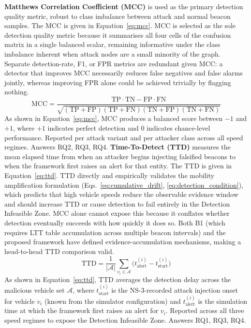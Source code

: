 \documentclass[12pt, a4paper]{report}
\begin{document}
\textbf{Matthews Correlation Coefficient (MCC)} is used as the
primary detection quality metric, robust to class imbalance between
attack and normal beacon samples. The MCC is given in
Equation~\ref{eq:mcc}.
\newline
\newline
MCC is selected as the sole detection quality metric because it
summarises all four cells of the confusion matrix in a single
balanced scalar, remaining informative under the class imbalance
inherent when attack nodes are a small minority of the graph.
Separate detection-rate, F1, or FPR metrics are redundant given
MCC: a detector that improves MCC necessarily reduces false
negatives and false alarms jointly, whereas improving FPR alone
could be achieved trivially by flagging nothing.
\begin{equation}
  \mathrm{MCC} = \frac{\mathrm{TP}\cdot\mathrm{TN}
                       - \mathrm{FP}\cdot\mathrm{FN}}
    {\sqrt{(\mathrm{TP}+\mathrm{FP})(\mathrm{TP}+\mathrm{FN})
           (\mathrm{TN}+\mathrm{FP})(\mathrm{TN}+\mathrm{FN})}}
  \label{eq:mcc}
\end{equation}
As shown in Equation~\ref{eq:mcc}, MCC produces a balanced score
between $-1$ and $+1$, where $+1$ indicates perfect detection and
$0$ indicates chance-level performance. Reported per attack variant
and per attacker class across all speed regimes. Answers
RQ2, RQ3, RQ4.
\newline
\newline
\textbf{Time-To-Detect (TTD)} measures the mean elapsed time from
when an attacker begins injecting falsified beacons to when the
framework first raises an alert for that entity. The TTD is given
in Equation~\ref{eq:ttd}.
\newline
\newline
TTD directly and empirically validates the mobility amplification
formulation (Eqs.~\ref{eq:cumulative_drift},
\ref{eq:detection_condition}), which predicts that high vehicle
speeds reduce the observable evidence window and should increase
TTD or cause detection to fail entirely in the Detection Infeasible
Zone. MCC alone cannot expose this because it conflates
whether detection eventually succeeds with how quickly it does so.
Both B1 (which requires LTT table accumulation across multiple
beacon intervals) and the proposed framework have defined
evidence-accumulation mechanisms, making a head-to-head TTD
comparison valid.
\begin{equation}
  \mathrm{TTD} = \frac{1}{|\mathcal{A}|}
    \sum_{v_i \in \mathcal{A}}
    \bigl(t_{\mathrm{alert}}^{(i)} - t_{\mathrm{start}}^{(i)}\bigr)
  \label{eq:ttd}
\end{equation}
As shown in Equation~\ref{eq:ttd}, TTD averages the detection
delay across the malicious vehicle set $\mathcal{A}$, where
$t_{\mathrm{start}}^{(i)}$ is the NS-3-recorded attack injection
onset for vehicle $v_i$ (known from the simulator configuration)
and $t_{\mathrm{alert}}^{(i)}$ is the simulation time at which the
framework first raises an alert for $v_i$.
Reported across all three speed regimes to expose the
Detection Infeasible Zone. Answers RQ1, RQ3, RQ4.
\end{document}

